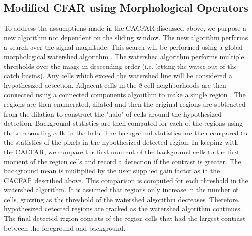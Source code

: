 \documentclass[journal]{IEEEtran}
\begin{document}
\subsection{Modified CFAR using Morphological Operators}
\par To address the assumptions made in the CACFAR discussed above, we purpose a new algorithm not dependent on the sliding window. The new algorithm performs a search over the signal magnitude. This search will be performed using a global morphological watershed algorithm \cite[p.~769-776]{gonzalez}. The watershed algorithm performs multiple thresholds over the image in descending order (i.e. letting the water out of the catch basins). Any cells which exceed the watershed line will be considered a hypothesized detection. Adjacent cells in the 8 cell neighborhoods are then connected using a connected components algorithm to make a single region \cite[p.645-647]{gonzalez}. The regions are then enumerated, dilated and then the original regions are subtracted from the dilation to construct the "halo" of cells around the hypothesized detection. Background statistics are then computed for each of the regions using the surrounding cells in the halo. The background statistics are then compared to the statistics of the pixels in the hypothesized detected region. In keeping with the CACFAR, we compare the first moment of the background cells to the first moment of the region cells and record a detection if the contrast is greater. The background mean is multiplied by the user supplied gain factor as in the CACFAR described above. This comparison is computed for each threshold in the watershed algorithm. It is assumed that regions only increase in the number of cells, growing as the threshold of the watershed algorithm decreases. Therefore, hypothesized detected regions are tracked as the watershed algorithm continues. The final detected region consists of the region cells that had the largest contrast between the foreground and background.
\end{document}
